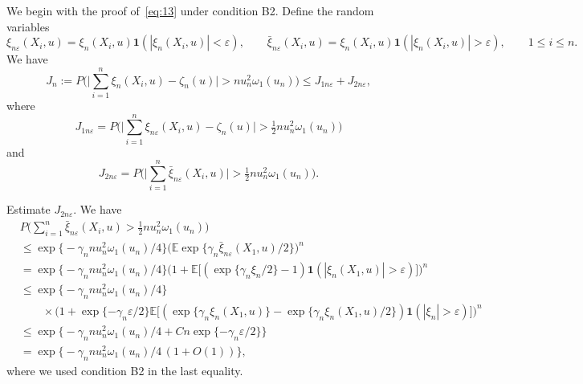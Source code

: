 \documentclass[11pt,a4paper]{article}
\begin{document}
We begin with the proof of~\eqref{eq:13} under condition B2. Define the random variables
\[
\xi_{n\varepsilon}(X_i,u)=\xi_n(X_i,u)\mathbf{1}(|\xi_n(X_i,u)|<\varepsilon),\qquad
\bar\xi_{n\varepsilon}(X_i,u)=\xi_n(X_i,u)\mathbf{1}(|\xi_n(X_i,u)|>\varepsilon),\qquad 1\le i\le n.
\]
We have
\begin{equation}
J_n:=P\Biggl(\Biggl|\sum_{i=1}^n\xi_n(X_i,u)-\zeta_n(u)\Biggr|>nu_n^2\omega_1(u_n)\Biggr)\le J_{1n\varepsilon}+J_{2n\varepsilon},
\label{eq:44}
\end{equation}
where
\begin{equation}
J_{1n\varepsilon}=P\Biggl(\Biggl|\sum_{i=1}^n\xi_{n\varepsilon}(X_i,u)-\zeta_n(u)\Biggr|>\tfrac12 nu_n^2\omega_1(u_n)\Biggr)
\label{eq:45}
\end{equation}
and
\begin{equation}
J_{2n\varepsilon}=P\Biggl(\Biggl|\sum_{i=1}^n\bar\xi_{n\varepsilon}(X_i,u)\Biggr|>\tfrac12 nu_n^2\omega_1(u_n)\Biggr).
\label{eq:46}
\end{equation}

Estimate $J_{2n\varepsilon}$. We have
\begin{equation}\label{qqur1}
\begin{split} &
    P\Biggl(\sum_{i=1}^n\bar\xi_{n\varepsilon}(X_i,u)>\tfrac12 nu_n^2\omega_1(u_n)\Biggr)\\
&\le\exp\bigl\{-\gamma_n nu_n^2\omega_1(u_n)/4\bigr\}\bigl(\mathbb{E}\exp\{\gamma_n\bar\xi_{n\varepsilon}(X_1,u)/2\}\bigr)^n\\
&=\exp\bigl\{-\gamma_n nu_n^2\omega_1(u_n)/4\bigr\}\bigl(1+\mathbb{E}\bigl[(\exp\{\gamma_n\xi_n/2\}-1)\mathbf{1}(|\xi_n(X_1,u)|>\varepsilon)\bigr]\bigr)^n\\
&\le\exp\bigl\{-\gamma_n nu_n^2\omega_1(u_n)/4\bigr\}\\
&\qquad\times\bigl(1+\exp\{-\gamma_n\varepsilon/2\}\mathbb{E}\bigl[(\exp\{\gamma_n\xi_n(X_1,u)\}-\exp\{\gamma_n\xi_n(X_1,u)/2\})\mathbf{1}(|\xi_n|>\varepsilon)\bigr]\bigr)^n\\
&\le\exp\bigl\{-\gamma_n nu_n^2\omega_1(u_n)/4+Cn\exp\{-\gamma_n\varepsilon/2\}\bigr\}\\
&=\exp\bigl\{-\gamma_n nu_n^2\omega_1(u_n)/4\,(1+O(1))\bigr\},
\end{split}
\end{equation}
where we used condition B2 in the last equality.
\end{document}
